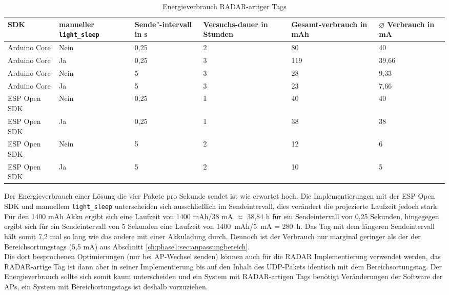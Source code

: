 \begin{table}[h]
	\centering
	\caption{Energieverbrauch RADAR-artiger Tags}
	\label{table:radarconsumption}
	\begin{tabular}{p{3cm}|p{2.2cm}|p{1.5cm}|p{2cm}|p{2cm}|p{2cm}}
		SDK & manueller \texttt{light\_sleep} & Sende"-intervall in s & Versuchs-dauer in Stunden & Gesamt-verbrauch in mAh & $\varnothing$ Verbrauch in mA \\
		\hline
		Arduino Core & Nein & 0,25 & 2 & 80 & 40 \\
		Arduino Core & Ja & 0,25 & 3 & 119 & 39,66 \\
		Arduino Core & Nein & 5 & 3 & 28 & 9,33 \\
		Arduino Core & Ja & 5 & 3 & 23 & 7,66 \\
		ESP Open SDK & Nein & 0,25 & 1 & 40 & 40 \\
		ESP Open SDK & Ja & 0,25 & 1 & 38 & 38 \\
		ESP Open SDK & Nein & 5 & 2 & 12 & 6 \\
		ESP Open SDK & Ja & 5 & 2 & 10 & 5 \\
	\end{tabular}
\end{table}

Der Energieverbrauch einer Lösung die vier Pakete pro Sekunde sendet ist wie erwartet hoch.
Die Implementierungen mit der ESP Open SDK und manuellem \texttt{light\_sleep} unterscheiden sich ausschließlich im Sendeintervall, dies verändert die projezierte Laufzeit jedoch stark.
Für den 1400 mAh Akku ergibt sich eine Laufzeit von 1400 mAh/38 mA $\approx$ 38,84 h für ein Sendeintervall von 0,25 Sekunden, hingegegen ergibt sich für ein Sendeintervall von 5 Sekunden eine Laufzeit von 1400\ mAh/5\ mA = 280\ h.
Das Tag mit dem längeren Sendeintervall hält somit 7,2 mal so lang wie das andere mit einer Akkuladung durch. 
Dennoch ist der Verbrauch nur marginal geringer als der der Bereichsortungstags (5,5 mA) aus Abschnitt \ref{ch:phase1:sec:anpassungbereich}. \\
Die dort besprochenen Optimierungen (nur bei AP-Wechsel senden) können auch für die RADAR Implementierung verwendet werden, das RADAR-artige Tag ist dann aber in seiner Implementierung bis auf den Inhalt des UDP-Pakets identisch mit dem Bereichsortungstag.
Der Energieverbrauch sollte sich somit kaum unterscheiden und ein System mit RADAR-artigen Tags benötigt Veränderungen der Software der APs, ein System mit Bereichortungstags ist deshalb vorzuziehen. \\

